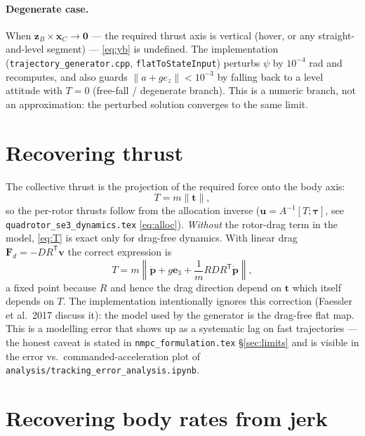 \documentclass[11pt]{article}
\begin{document}
\paragraph{Degenerate case.} When $\bm z_B \times \bm x_C \to \bm 0$ — the required thrust
axis is vertical (hover, or any straight-and-level segment) — \eqref{eq:yb} is undefined.
The implementation (\texttt{trajectory\_generator.cpp}, \texttt{flatToStateInput})
perturbs $\psi$ by $10^{-4}$ rad and recomputes, and also guards $\|a + g e_z\| < 10^{-3}$
by falling back to a level attitude with $T = 0$ (free-fall / degenerate branch). This is a
numeric branch, not an approximation: the perturbed solution converges to the same limit.

\section{Recovering thrust}

The collective thrust is the projection of the required force onto the body axis:
\begin{equation}
  T = m \|\bm t\|,
  \label{eq:T}
\end{equation}
so the per-rotor thrusts follow from the allocation inverse
($\bm u = A^{-1}[T; \bm\tau]$, see \texttt{quadrotor\_se3\_dynamics.tex}
\eqref{eq:alloc}). \emph{Without} the rotor-drag term in the model, \eqref{eq:T} is exact
only for drag-free dynamics. With linear drag $\bm F_d = -D R^{\mathsf T} \bm v$ the correct
expression is
\begin{equation}
  T = m \left\| \ddot{\bm p} + g \bm e_3 + \frac{1}{m} R D R^{\mathsf T} \dot{\bm p}
  \right\|,
  \label{eq:Tdrag}
\end{equation}
a fixed point because $R$ and hence the drag direction depend on $\bm t$ which itself
depends on $T$. The implementation intentionally ignores this correction (Faessler et al.\
2017 discuss it): the model used by the generator is the drag-free flat map. This is a
modelling error that shows up as a systematic lag on fast trajectories — the honest caveat
is stated in \texttt{nmpc\_formulation.tex} \S\ref{sec:limits} and is visible in the error
vs.\ commanded-acceleration plot of \texttt{analysis/tracking\_error\_analysis.ipynb}.

\section{Recovering body rates from jerk}
\end{document}
